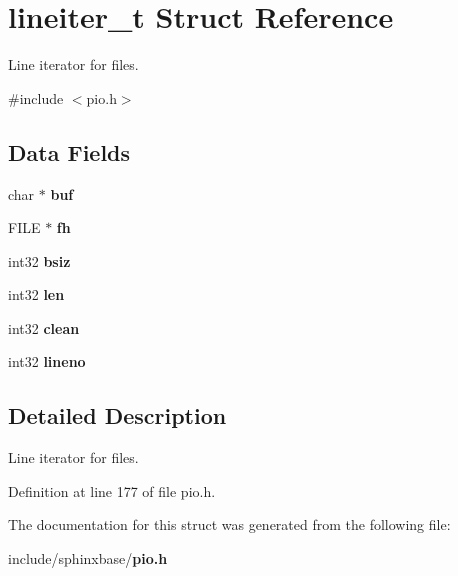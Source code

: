\section{lineiter\-\_\-t Struct Reference}
\label{structlineiter__t}


Line iterator for files.  




{\ttfamily \#include $<$pio.\-h$>$}

\subsection*{Data Fields}
\begin{DoxyCompactItemize}
\item 
char $\ast$ {\bfseries buf}\label{structlineiter__t_a1bf482b3c2722af76102f7b4aae08e47}

\item 
F\-I\-L\-E $\ast$ {\bfseries fh}\label{structlineiter__t_a08628d796a4850494f29f62dc0e55148}

\item 
int32 {\bfseries bsiz}\label{structlineiter__t_ac74d820746ced8a422c37ec48c592827}

\item 
int32 {\bfseries len}\label{structlineiter__t_ae40e5af2b7e231200d597610840c1e34}

\item 
int32 {\bfseries clean}\label{structlineiter__t_a800c26617f85d52aa4f3c8f6c3e6f96a}

\item 
int32 {\bfseries lineno}\label{structlineiter__t_ae8215b7dfb61b9718dab96c7c9d22311}

\end{DoxyCompactItemize}


\subsection{Detailed Description}
Line iterator for files. 

Definition at line 177 of file pio.\-h.



The documentation for this struct was generated from the following file\-:\begin{DoxyCompactItemize}
\item 
include/sphinxbase/{\bf pio.\-h}\end{DoxyCompactItemize}
